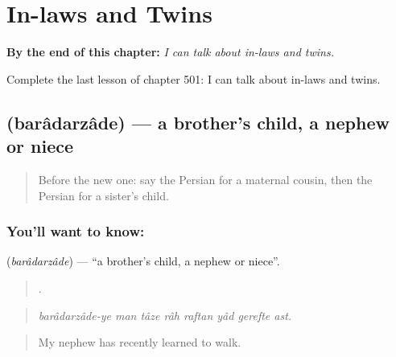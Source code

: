 
\chapter{In-laws and Twins}
\label{ch:fa-in-laws-and-twins}

\begin{chapteropening}
\textbf{By the end of this chapter:} \emph{I can talk about in-laws and twins.}

Complete the last lesson of chapter 501: I can talk about in-laws and twins.
\end{chapteropening}

\section[\texorpdfstring{\fa{برادرزاده} (barâdarzâde)}{برادرزاده (barâdarzâde)}]{ (barâdarzâde) — a brother's child, a nephew or niece}

\label{lesson:FA-C501-baradarzade}



\begin{quote}
Before the new one: say the Persian for a maternal cousin, then the Persian for a sister's child.
\end{quote}

\subsection*{You'll want to know: }
\textbf{} (\emph{barâdarzâde}) — \textquotedblleft{}a brother's child, a nephew or niece\textquotedblright{}.

\begin{quote}
       .
\end{quote}

\begin{quote}
\emph{barâdarzâde-ye man tâze râh raftan yâd gerefte ast.}
\end{quote}

\begin{quote}
My nephew has recently learned to walk.
\end{quote}

